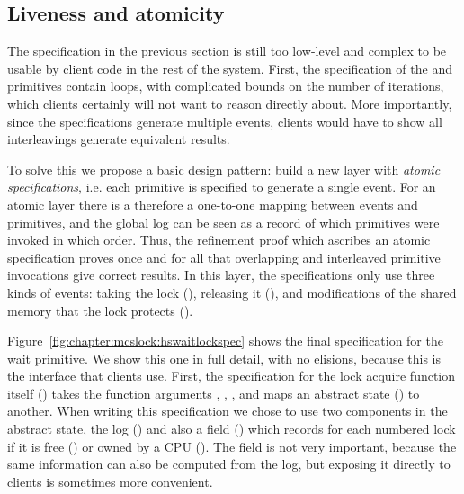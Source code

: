 \subsection{Liveness and atomicity}
\label{chapter:mcslock:sec:liveness-atomicity}

The specification in the previous section is still too low-level and
complex to be usable by client code in the rest of the system.  First,
the specification of the  and
 primitives contain loops, with complicated
bounds on the number of iterations, which clients certainly will not
want to reason directly about.  More importantly, since the
specifications generate multiple events, clients would have to show
all interleavings generate equivalent results.

To solve this we propose a basic design
pattern: build a new layer with \emph{atomic specifications},
i.e. each primitive is specified to generate  a single event.
For an atomic layer there is a
therefore a one-to-one mapping between events and primitives, and the global log
can be seen as a record of which primitives were invoked in which
order. Thus, the refinement proof which ascribes an atomic
specification proves once and for all that overlapping and interleaved
primitive invocations give correct results.
In this layer, the specifications only use three kinds 
of events: taking the lock (),
releasing it (), and modifications of the shared
memory that the lock protects ().

Figure~\ref{fig:chapter:mcslock:hswaitlockspec} shows the final specification for the
wait primitive. We show this one in full detail, with no elisions,
because this is the interface that clients use. First, the
specification for the lock acquire function itself
() takes the function arguments
, , , and maps an
abstract state () to another. When writing this
specification we chose to use two components in the abstract state, the
log () and also a field () which
records for each numbered lock if it is free ()
or owned by a CPU (). The  field is
not very important, because the same information can also be computed
from the log, but exposing it directly to clients is sometimes more
convenient.

